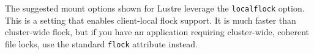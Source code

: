 \begin{center}
\begin{tcolorbox}[]
\small

The suggested mount options shown for Lustre leverage the
\texttt{localflock} option. This is a
\href{http://wiki.lustre.org/Mounting_a_Lustre_File_System_on_Client_Nodes}{\color{blue}{Lustre-specific}}
setting that enables client-local flock support. It is much faster
than cluster-wide flock, but if you have an application requiring
cluster-wide, coherent file locks, use the standard \texttt{flock}
attribute instead.

\end{tcolorbox}
\end{center}
